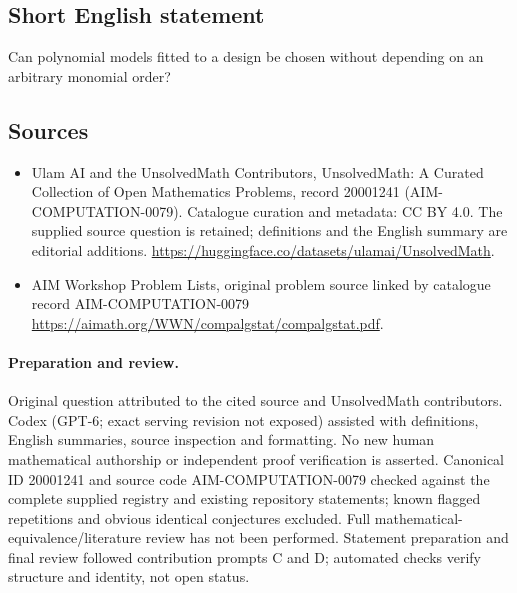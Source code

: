 \documentclass[11pt]{article}
\begin{document}
\subsection{Short English statement}
Can polynomial models fitted to a design be chosen without depending on an arbitrary monomial order?
\subsection{Sources}
\begin{itemize}
\item[\hypertarget{source:20001241:1}{S1}] Ulam AI and the UnsolvedMath Contributors, UnsolvedMath: A Curated Collection of Open Mathematics Problems, record 20001241 (AIM-COMPUTATION-0079). Catalogue curation and metadata: CC BY 4.0. The supplied source question is retained; definitions and the English summary are editorial additions.
\url{https://huggingface.co/datasets/ulamai/UnsolvedMath}.
\item[\hypertarget{source:20001241:2}{S2}] AIM Workshop Problem Lists, original problem source linked by catalogue record AIM-COMPUTATION-0079
\url{https://aimath.org/WWN/compalgstat/compalgstat.pdf}.
\end{itemize}
\paragraph{Preparation and review.}
Original question attributed to the cited source and UnsolvedMath contributors. Codex (GPT-6; exact serving revision not exposed) assisted with definitions, English summaries, source inspection and formatting. No new human mathematical authorship or independent proof verification is asserted. Canonical ID 20001241 and source code AIM-COMPUTATION-0079 checked against the complete supplied registry and existing repository statements; known flagged repetitions and obvious identical conjectures excluded. Full mathematical-equivalence/literature review has not been performed. Statement preparation and final review followed contribution prompts C and D; automated checks verify structure and identity, not open status.
\label{end:20001241}
\end{document}
